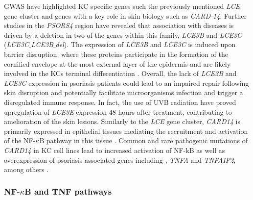GWAS have highlighted KC specific genes such the previously mentioned \textit{LCE} gene cluster and genes with a key role in skin biology such as \textit{CARD-14}. Further studies in the \textit{PSORS4} region have revealed that association with diseases is driven by a deletion in two of the genes within this family, \textit{LCE3B} and \textit{LCE3C} (\textit{LCE3C$\_ $LCE3B$\_ $del})\parencite{Cid2009}. The expression of \textit{LCE3B} and \textit{LCE3C} is induced upon barrier disruption, where these proteins participate in the formation of the cornified envelope at the most external layer of the epidermis and are likely involved in the KCs terminal differentiation \parencite{Bergboer2011}. Overall, the lack of \textit{LCE3B} and \textit{LCE3C} expression in psoriasis patients could lead to an impaired repair following skin disruption and potentially facilitate microorganisms infection and trigger a disregulated immune response. In fact, the use of UVB radiation have proved upregulation of \textit{LCE3E} expression 48 hours after treatment, contributing to amelioration of the skin lesions\parencite{Jackson2005}. %
Similarly to the \textit{LCE} gene cluster, \textit{CARD14} is primarily expressed in epithelial tissues mediating the recruitment and activation of the NF-$\kappa$B pathway in this tissue \parencite{Blonska2011}. Common and rare pathogenic mutations of \textit{CARD14} in KC cell lines lead to increased activation of NF-kB as well as overexpression of psoriasis-associated genes including , \textit{TNFA} and \textit{TNFAIP2}, among others \parencite{Jordan2012b}.



\subsubsection*{NF-$\kappa$B and TNF pathways}

